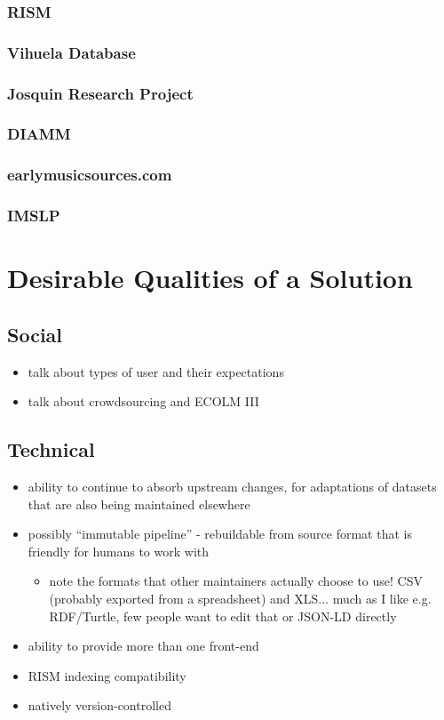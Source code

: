 \documentclass[twocolumn,10pt]{paper}
\begin{document}
\begin{sloppypar}
  \subsubsection{RISM}
  \subsubsection{Vihuela Database}
  \subsubsection{Josquin Research Project}
  \subsubsection{DIAMM}
  \subsubsection{earlymusicsources.com}
  \subsubsection{IMSLP}

  \section{Desirable Qualities of a Solution}
  \subsection{Social}

  \begin{itemize}
  \item talk about types of user and their expectations
  \item talk about crowdsourcing and ECOLM III
  \end{itemize}

  
  \subsection{Technical}

  \begin{itemize}
  \item ability to continue to absorb upstream changes, for
    adaptations of datasets that are also being maintained elsewhere
  \item possibly ``immutable pipeline'' - rebuildable from source
    format that is friendly for humans to work with
    \begin{itemize}
      \item note the formats that other maintainers actually choose to
        use! CSV (probably exported from a spreadsheet) and
        XLS... much as I like e.g. RDF/Turtle, few people want to edit
        that or JSON-LD directly
    \end{itemize}
  \item ability to provide more than one front-end 
  \item RISM indexing compatibility
  \item natively version-controlled
  \end{itemize}


\end{sloppypar}
\end{document}
